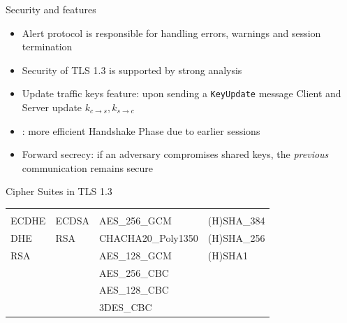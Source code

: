 \documentclass[usenames,dvipsnames, 9pt]{beamer}
\begin{document}
\begin{frame}{Security and features}
	\Large
	\begin{itemize}
		\itemsep 8pt
		\item {\color{Orange} Alert protocol} is responsible for handling errors, warnings and  session termination
		\item {\color{Orange} Security} of TLS 1.3 is supported by strong analysis
		\item {\color{Orange} Update traffic keys feature:} upon  sending a \texttt{KeyUpdate} message Client and Server update $k_{c\rightarrow s}, k_{s\rightarrow c}$
		\item {\color{Orange}{Pre-shared key handshake}}: more efficient Handshake Phase due to earlier sessions
		\item {\color{Orange}Forward secrecy:} if an adversary compromises shared keys, the \emph{previous} communication remains secure
	\end{itemize}
\end{frame}


\begin{frame}{Cipher Suites in TLS 1.3}
\Large
		\begin{tabular}{l l l l }
		\hspace{-20pt}	\textbf{\color{Orange}{Key Exchange}} & \textbf{\color{Orange}{Certificates}} & \textbf{\color{Orange}{Sym. encryption }} & \textbf{\color{Orange}{Hash}} \\[10pt]
		\hspace{-20pt}	ECDHE & ECDSA & AES\_256\_GCM & (H)SHA\_384 \\[5pt]
		\hspace{-20pt}	DHE & RSA & CHACHA20\_Poly1350 & (H)SHA\_256 \\[5pt]
		\hspace{-20pt}	{\color{gray}RSA} &  & AES\_128\_GCM & (H)SHA1 \\[15pt]
		\hspace{-20pt}	 &  & AES\_256\_CBC &  \\[5pt]
		\hspace{-20pt}	 &  & AES\_128\_CBC &  \\[15pt]
		\hspace{-20pt}	 &  & {\color{gray}3DES\_CBC} &  \\[10pt]
		\end{tabular}
\end{frame}
\end{document}
